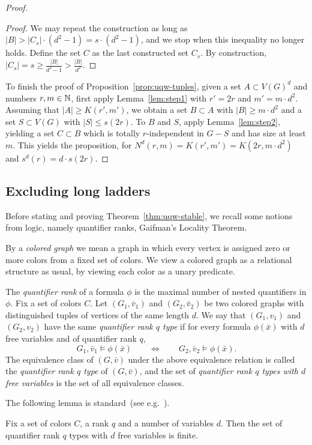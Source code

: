 \begin{proof}
\begin{proof}
We may repeat the construction as long as $|B|>|C_s|\cdot (d^2-1)=s\cdot (d^2-1)$, and we stop when this inequality no longer holds. Define the set $C$ as the last constructed set $C_s$.
By construction, $|C_s|=s\ge 
\frac{|B|}{d^2-1}>\frac{|B|}{d^2}$.	
\end{proof}

To finish the proof of Proposition~\ref{prop:uqw-tuples},
given a set $A\subset V(G)^d$ and numbers $r,m\in\mathbb{N}$,
first apply Lemma~\ref{lem:step1} 
  with $r'=2r$ and
 $m'= m\cdot d^2$.
 Assuming that $|A|\ge K(r',m')$, 
we obtain a set $B\subset A$ with $|B|\ge m\cdot d^2$ and a set $S\subset V(G)$ with $|S|\le s(2r)$.
To $B$ and $S$, apply Lemma~\ref{lem:step2}, yielding a set $C\subset B$ which is totally $r$-independent in $G-S$ and has size at least $m$. This yields the proposition, for $N^d(r,m)=K(r',m')=K(2r,m\cdot d^2)$
and $s^d(r)=d\cdot s(2r)$.
\end{proof}


\subsection{Excluding long ladders}
\label{sec:uqw-stable}

Before stating and proving Theorem~\ref{thm:uqw-stable}, we recall some notions from logic, namely quantifier ranks, Gaifman's Locality Theorem.


By a \emph{colored graph} we mean a graph  in which 
every vertex is assigned zero or more colors from a fixed set of colors. We view a colored graph as a relational structure as usual, by viewing each color as a unary predicate. 

The \emph{quantifier rank} of a formula $\phi$ is the maximal number of nested quantifiers in $\phi$. Fix a set of colors $C$.
Let $(G_1,\bar v_1)$ and $(G_2,\bar v_2)$ be two
colored graphs with distinguished tuples of vertices of the same length $d$. We say that $(G_1,v_1)$ and $(G_2,v_2)$
have the same \emph{quantifier rank $q$ type}
if for every formula $\phi(\bar x)$ with $d$ free variables and of quantifier rank $q$,
 $$G_1,\bar v_1\models \phi(\bar x)\qquad\iff \qquad G_2,\bar v_2\models \phi(\bar x).$$
 The equivalence class of $(G,\bar v)$ under the above equivalence relation is called the \emph{quantifier rank $q$ type} of $(G,\bar v)$, and  the set of \emph{quantifier rank $q$ types with $d$ free variables}
is the set of all equivalence classes.

The following lemma is standard~(see e.g.~\cite{libkin}).
\begin{lemma}\label{lem:q-types}
	Fix a set of colors $C$, a rank $q$ and a number of variables $d$.
	Then the set of quantifier rank $q$ types with $d$ free variables is finite.
\end{lemma}


